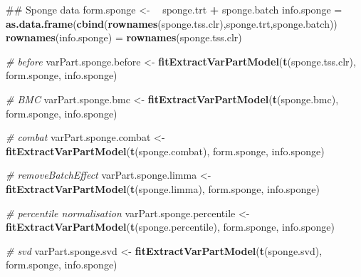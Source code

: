\documentclass[]{book}
\newenvironment{Shaded}{\begin{snugshade}}{\end{snugshade}}
\newcommand{\KeywordTok}[1]{\textcolor[rgb]{0.13,0.29,0.53}{\textbf{#1}}}
\newcommand{\StringTok}[1]{\textcolor[rgb]{0.31,0.60,0.02}{#1}}
\newcommand{\CommentTok}[1]{\textcolor[rgb]{0.56,0.35,0.01}{\textit{#1}}}
\newcommand{\OperatorTok}[1]{\textcolor[rgb]{0.81,0.36,0.00}{\textbf{#1}}}
\newcommand{\ErrorTok}[1]{\textcolor[rgb]{0.64,0.00,0.00}{\textbf{#1}}}
\newcommand{\NormalTok}[1]{#1}
\begin{document}
\begin{Shaded}
\begin{Highlighting}[]
\NormalTok{## Sponge data}
\NormalTok{form.sponge <-}\StringTok{ }\ErrorTok{~}\StringTok{ }\NormalTok{sponge.trt }\OperatorTok{+}\StringTok{ }\NormalTok{sponge.batch}
\NormalTok{info.sponge =}\StringTok{ }\KeywordTok{as.data.frame}\NormalTok{(}\KeywordTok{cbind}\NormalTok{(}\KeywordTok{rownames}\NormalTok{(sponge.tss.clr),sponge.trt,sponge.batch))}
\KeywordTok{rownames}\NormalTok{(info.sponge) =}\StringTok{ }\KeywordTok{rownames}\NormalTok{(sponge.tss.clr)}

\CommentTok{# before}
\NormalTok{varPart.sponge.before <-}\StringTok{ }\KeywordTok{fitExtractVarPartModel}\NormalTok{(}\KeywordTok{t}\NormalTok{(sponge.tss.clr), form.sponge, info.sponge)}

\CommentTok{# BMC}
\NormalTok{varPart.sponge.bmc <-}\StringTok{ }\KeywordTok{fitExtractVarPartModel}\NormalTok{(}\KeywordTok{t}\NormalTok{(sponge.bmc), form.sponge, info.sponge)}

\CommentTok{# combat}
\NormalTok{varPart.sponge.combat <-}\StringTok{ }\KeywordTok{fitExtractVarPartModel}\NormalTok{(}\KeywordTok{t}\NormalTok{(sponge.combat), form.sponge, info.sponge)}

\CommentTok{# removeBatchEffect}
\NormalTok{varPart.sponge.limma <-}\StringTok{ }\KeywordTok{fitExtractVarPartModel}\NormalTok{(}\KeywordTok{t}\NormalTok{(sponge.limma), form.sponge, info.sponge)}

\CommentTok{# percentile normalisation}
\NormalTok{varPart.sponge.percentile <-}\StringTok{ }\KeywordTok{fitExtractVarPartModel}\NormalTok{(}\KeywordTok{t}\NormalTok{(sponge.percentile), form.sponge, info.sponge)}

\CommentTok{# svd}
\NormalTok{varPart.sponge.svd <-}\StringTok{ }\KeywordTok{fitExtractVarPartModel}\NormalTok{(}\KeywordTok{t}\NormalTok{(sponge.svd), form.sponge, info.sponge)}



\end{Highlighting}
\end{Shaded}
\end{document}
